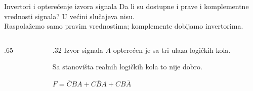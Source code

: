 \begin{frame}[label=02-s020]{Invertori i opterećenje izvora signala}
Da li su dostupne i prave i komplementne vrednosti signala? \alert{U većini slučajeva nisu.}\\
Raspolažemo samo pravim vrednostima; komplemente dobijamo invertorima.
\par\vspace{0mm}
\begin{columns}[T,onlytextwidth]
\begin{column}{.65\textwidth}\centering

\end{column}
\begin{column}{.32\textwidth}
Izvor signala \(A\) opterećen je sa tri ulaza logičkih kola.\par\vspace{2mm}
\alert{Sa stanovišta realnih logičkih kola to nije dobro.}
\par\vspace{3mm}
\(F=\bar CBA+C\bar BA+CB\bar A\)
\end{column}
\end{columns}
\end{frame}
